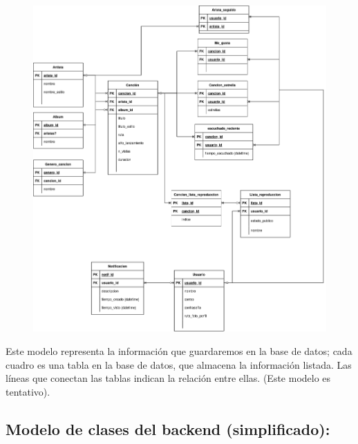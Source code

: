 \documentclass[12pt]{article}
\begin{document}
\begin{figure}[H]
\centering
\includegraphics[width=16cm]{Modelo Relacional.png}
\end{figure}

Este modelo representa la información que guardaremos en la base de datos; cada cuadro es una tabla en la base de datos, que almacena la información listada. Las líneas que conectan las tablas indican la relación entre ellas. (Este modelo es tentativo).

\subsection{Modelo de clases del backend (simplificado):}
\end{document}
